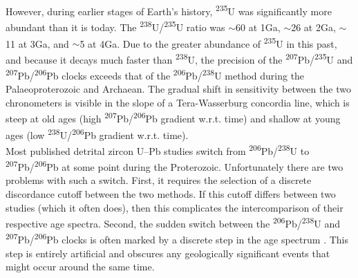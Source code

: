 \documentclass[gchron, manuscript]{copernicus}
\begin{document}
However, during earlier stages of Earth's history,
\textsuperscript{235}U was significantly more abundant than it is
today. The \textsuperscript{238}U/\textsuperscript{235}U ratio was
$\sim$60 at 1Ga, $\sim$26 at 2Ga, $\sim$11 at 3Ga, and $\sim$5 at 4Ga.
Due to the greater abundance of \textsuperscript{235}U in this past,
and because it decays much faster than \textsuperscript{238}U, the
precision of the \textsuperscript{207}Pb/\textsuperscript{235}U and
\textsuperscript{207}Pb/\textsuperscript{206}Pb clocks exceeds that of
the \textsuperscript{206}Pb/\textsuperscript{238}U method during the
Palaeoproterozoic and Archaean. The gradual shift in sensitivity
between the two chronometers is visible in the slope of a
Tera-Wasserburg concordia line, which is steep at old ages (high
\textsuperscript{207}Pb/\textsuperscript{206}Pb gradient w.r.t. time)
and shallow at young ages (low
\textsuperscript{238}U/\textsuperscript{206}Pb gradient
w.r.t. time).\\

Most published detrital zircon U--Pb studies switch from
\textsuperscript{206}Pb/\textsuperscript{238}U to
\textsuperscript{207}Pb/\textsuperscript{206}Pb at some point during
the Proterozoic. Unfortunately there are two problems with such a
switch. First, it requires the selection of a discrete discordance
cutoff between the two methods. If this cutoff differs between two
studies (which it often does), then this complicates the
intercomparison of their respective age spectra. Second, the sudden
switch between the \textsuperscript{206}Pb/\textsuperscript{238}U and
\textsuperscript{207}Pb/\textsuperscript{206}Pb clocks is often marked
by a discrete step in the age spectrum \citep{puetz2018}. This step is
entirely artificial and obscures any geologically significant events
that might occur around the same time.\\
\end{document}
